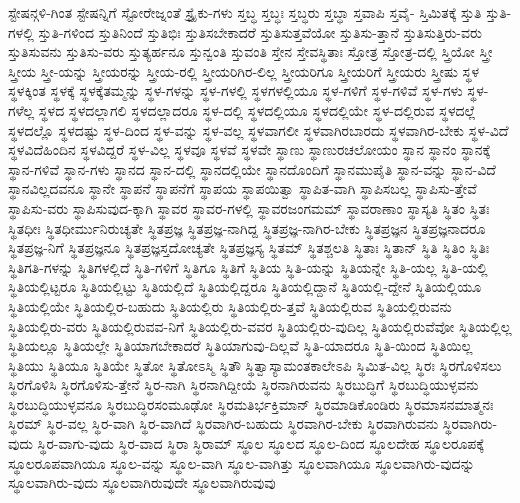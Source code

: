 {ಸ್ಟೇಷನ್ಗಳಿ-ಗಿಂತ
ಸ್ಟೇಷನ್ನಿಗೆ
ಸ್ಟೋರೇಜ್ನಂತೆ
ಸ್ಟ್ರೈಕು-ಗಳು
ಸ್ತಬ್ಧ
ಸ್ತಬ್ಧಃ
ಸ್ತಬ್ಧರು
ಸ್ತಬ್ಧಾ
ಸ್ತವಾಪಿ
ಸ್ತವೈ-
ಸ್ತಿಮಿತಕ್ಕೆ
ಸ್ತುತಿ
ಸ್ತುತಿ-ಗಳಲ್ಲಿ
ಸ್ತುತಿ-ಗಳಿಂದ
ಸ್ತುತಿನಿಂದೆ
ಸ್ತುತಿಭಿಃ
ಸ್ತುತಿಸಬೇಕಾದರೆ
ಸ್ತುತಿಸುತ್ತವೆಯೋ
ಸ್ತುತಿಸು-ತ್ತಾನೆ
ಸ್ತುತಿಸುತ್ತಿರು-ವರು
ಸ್ತುತಿಸುವನು
ಸ್ತುತಿಸು-ವರು
ಸ್ತುತ್ಯರ್ಹನೂ
ಸ್ತುನ್ವಂತಿ
ಸ್ತುವಂತಿ
ಸ್ತೇನ
ಸ್ತೇವಸ್ಥಿತಾಃ
ಸ್ತೋತ್ರ
ಸ್ತೋತ್ರ-ದಲ್ಲಿ
ಸ್ತ್ರಿಯೋ
ಸ್ತ್ರೀ
ಸ್ತ್ರೀಯ
ಸ್ತ್ರೀ-ಯನ್ನು
ಸ್ತ್ರೀಯರನ್ನು
ಸ್ತ್ರೀಯ-ರಲ್ಲಿ
ಸ್ತ್ರೀಯರಿಗಿರ-ಲಿಲ್ಲ
ಸ್ತ್ರೀಯರಿಗೂ
ಸ್ತ್ರೀಯರಿಗೆ
ಸ್ತ್ರೀಯರು
ಸ್ತ್ರೀಷು
ಸ್ಥಳ
ಸ್ಥಳಕ್ಕಿಂತ
ಸ್ಥಳಕ್ಕೆ
ಸ್ಥಳಕ್ಕೆತಮ್ಮನ್ನು
ಸ್ಥಳ-ಗಳನ್ನು
ಸ್ಥಳ-ಗಳಲ್ಲಿ
ಸ್ಥಳಗಳಲ್ಲಿಯೂ
ಸ್ಥಳ-ಗಳಿಗೆ
ಸ್ಥಳ-ಗಳಿವೆ
ಸ್ಥಳ-ಗಳು
ಸ್ಥಳ-ಗಳೆಲ್ಲ
ಸ್ಥಳದ
ಸ್ಥಳದಲ್ಲಾಗಲಿ
ಸ್ಥಳದಲ್ಲಾದರೂ
ಸ್ಥಳ-ದಲ್ಲಿ
ಸ್ಥಳದಲ್ಲಿಯೂ
ಸ್ಥಳದಲ್ಲಿಯೇ
ಸ್ಥಳ-ದಲ್ಲಿರುವ
ಸ್ಥಳದಲ್ಲೆ
ಸ್ಥಳದಲ್ಲೊ
ಸ್ಥಳದಷ್ಟು
ಸ್ಥಳ-ದಿಂದ
ಸ್ಥಳ-ವನ್ನು
ಸ್ಥಳ-ವಲ್ಲ
ಸ್ಥಳವಾಗಲೀ
ಸ್ಥಳವಾಗಿರಬಾರದು
ಸ್ಥಳವಾಗಿರ-ಬೇಕು
ಸ್ಥಳ-ವಿದೆ
ಸ್ಥಳವಿದೆಹಿಂದಿನ
ಸ್ಥಳವಿದ್ದರೆ
ಸ್ಥಳ-ವಿಲ್ಲ
ಸ್ಥಳವೂ
ಸ್ಥಳವೆ
ಸ್ಥಳವೇ
ಸ್ಥಾಣು
ಸ್ಥಾಣುರಚಲೋಯಂ
ಸ್ಥಾನ
ಸ್ಥಾನಂ
ಸ್ಥಾನಕ್ಕೆ
ಸ್ಥಾನ-ಗಳಿವೆ
ಸ್ಥಾನ-ಗಳು
ಸ್ಥಾನದ
ಸ್ಥಾನ-ದಲ್ಲಿ
ಸ್ಥಾನದಲ್ಲಿಯೇ
ಸ್ಥಾನದೊಂದಿಗೆ
ಸ್ಥಾನಮುಪೈತಿ
ಸ್ಥಾನ-ವನ್ನು
ಸ್ಥಾನ-ವಿದೆ
ಸ್ಥಾನವಿಲ್ಲದವನೂ
ಸ್ಥಾನೇ
ಸ್ಥಾಪನೆ
ಸ್ಥಾಪನೆಗೆ
ಸ್ಥಾಪಯ
ಸ್ಥಾಪಯಿತ್ವಾ
ಸ್ಥಾಪಿತ-ವಾಗಿ
ಸ್ಥಾಪಿಸಬಲ್ಲ
ಸ್ಥಾಪಿಸು-ತ್ತೇವೆ
ಸ್ಥಾಪಿಸು-ವರು
ಸ್ಥಾಪಿಸುವುದ-ಕ್ಕಾಗಿ
ಸ್ಥಾವರ
ಸ್ಥಾವರ-ಗಳಲ್ಲಿ
ಸ್ಥಾವರಜಂಗಮಮ್
ಸ್ಥಾವರಾಣಾಂ
ಸ್ಥಾಸ್ಯತಿ
ಸ್ಥಿತಂ
ಸ್ಥಿತಃ
ಸ್ಥಿತಧೀಃ
ಸ್ಥಿತಧೀರ್ಮುನಿರುಚ್ಯತೇ
ಸ್ಥಿತಪ್ರಜ್ಞ
ಸ್ಥಿತಪ್ರಜ್ಞ-ನಾಗಿದ್ದ
ಸ್ಥಿತಪ್ರಜ್ಞ-ನಾಗಿರ-ಬೇಕು
ಸ್ಥಿತಪ್ರಜ್ಞನ
ಸ್ಥಿತಪ್ರಜ್ಞನಾದರೂ
ಸ್ಥಿತಪ್ರಜ್ಞ-ನಿಗೆ
ಸ್ಥಿತಪ್ರಜ್ಞನೂ
ಸ್ಥಿತಪ್ರಜ್ಞಸ್ತದೋಚ್ಯತೇ
ಸ್ಥಿತಪ್ರಜ್ಞಸ್ಯ
ಸ್ಥಿತಮ್
ಸ್ಥಿತಶ್ಚಲತಿ
ಸ್ಥಿತಾಃ
ಸ್ಥಿತಾನ್
ಸ್ಥಿತಿ
ಸ್ಥಿತಿಂ
ಸ್ಥಿತಿಃ
ಸ್ಥಿತಿಗತಿ-ಗಳನ್ನು
ಸ್ಥಿತಿಗಳಲ್ಲಿದೆ
ಸ್ಥಿತಿ-ಗಳಿಗೆ
ಸ್ಥಿತಿಗೂ
ಸ್ಥಿತಿಗೆ
ಸ್ಥಿತಿಯ
ಸ್ಥಿತಿ-ಯನ್ನು
ಸ್ಥಿತಿಯನ್ನೇ
ಸ್ಥಿತಿ-ಯಲ್ಲ
ಸ್ಥಿತಿ-ಯಲ್ಲಿ
ಸ್ಥಿತಿಯಲ್ಲಿಟ್ಟರೂ
ಸ್ಥಿತಿಯಲ್ಲಿಟ್ಟು
ಸ್ಥಿತಿಯಲ್ಲಿದೆ
ಸ್ಥಿತಿಯಲ್ಲಿದ್ದರೂ
ಸ್ಥಿತಿಯಲ್ಲಿದ್ದಾನೆ
ಸ್ಥಿತಿಯಲ್ಲಿ-ದ್ದೇನೆ
ಸ್ಥಿತಿಯಲ್ಲಿಯೂ
ಸ್ಥಿತಿಯಲ್ಲಿಯೇ
ಸ್ಥಿತಿಯಲ್ಲಿರ-ಬಹುದು
ಸ್ಥಿತಿಯಲ್ಲಿರು
ಸ್ಥಿತಿಯಲ್ಲಿರು-ತ್ತವೆ
ಸ್ಥಿತಿಯಲ್ಲಿರುವ
ಸ್ಥಿತಿಯಲ್ಲಿರುವನು
ಸ್ಥಿತಿಯಲ್ಲಿರು-ವರು
ಸ್ಥಿತಿಯಲ್ಲಿರುವವ-ನಿಗೆ
ಸ್ಥಿತಿಯಲ್ಲಿರು-ವವರ
ಸ್ಥಿತಿಯಲ್ಲಿರು-ವುದಿಲ್ಲ
ಸ್ಥಿತಿಯಲ್ಲಿರುವೆವೋ
ಸ್ಥಿತಿಯಲ್ಲಿಲ್ಲ
ಸ್ಥಿತಿಯಲ್ಲೂ
ಸ್ಥಿತಿಯಲ್ಲೇ
ಸ್ಥಿತಿಯಾಗಬೇಕಾದರೆ
ಸ್ಥಿತಿಯಾಗುವು-ದಿಲ್ಲವೆ
ಸ್ಥಿತಿ-ಯಾದರೂ
ಸ್ಥಿತಿ-ಯಿಂದ
ಸ್ಥಿತಿಯಿಲ್ಲ
ಸ್ಥಿತಿಯು
ಸ್ಥಿತಿಯೂ
ಸ್ಥಿತಿಯೇ
ಸ್ಥಿತೋ
ಸ್ಥಿತೋಽಸ್ಮಿ
ಸ್ಥಿತೌ
ಸ್ಥಿತ್ವಾಸ್ಯಾಮಂತಕಾಲೇಽಪಿ
ಸ್ಥಿಮಿತ-ವಿಲ್ಲ
ಸ್ಥಿರಃ
ಸ್ಥಿರಗೊಳಿಸಲು
ಸ್ಥಿರಗೊಳಿಸಿ
ಸ್ಥಿರಗೊಳಿಸು-ತ್ತೇನೆ
ಸ್ಥಿರ-ನಾಗಿ
ಸ್ಥಿರನಾಗಿದ್ದೀಯೆ
ಸ್ಥಿರನಾಗಿರುವನು
ಸ್ಥಿರಬುದ್ಧಿಗೆ
ಸ್ಥಿರಬುದ್ಧಿಯುಳ್ಳವನು
ಸ್ಥಿರಬುದ್ಧಿಯುಳ್ಳವನೂ
ಸ್ಥಿರಬುದ್ಧಿರಸಂಮೂಢೋ
ಸ್ಥಿರಮತಿರ್ಭಕ್ತಿಮಾನ್
ಸ್ಥಿರಮಾಡಿಕೊಂಡಿರು
ಸ್ಥಿರಮಾಸನಮಾತ್ಮನಃ
ಸ್ಥಿರಮ್
ಸ್ಥಿರ-ವಲ್ಲ
ಸ್ಥಿರ-ವಾಗಿ
ಸ್ಥಿರ-ವಾಗಿದೆ
ಸ್ಥಿರವಾಗಿರ-ಬಹುದು
ಸ್ಥಿರವಾಗಿರ-ಬೇಕು
ಸ್ಥಿರವಾಗಿರುವನು
ಸ್ಥಿರವಾಗಿರು-ವುದು
ಸ್ಥಿರ-ವಾಗು-ವುದು
ಸ್ಥಿರ-ವಾದ
ಸ್ಥಿರಾ
ಸ್ಥಿರಾಮ್
ಸ್ಥೂಲ
ಸ್ಥೂಲದ
ಸ್ಥೂಲ-ದಿಂದ
ಸ್ಥೂಲದೇಹ
ಸ್ಥೂಲರೂಪಕ್ಕೆ
ಸ್ಥೂಲರೂಪವಾಗಿಯೂ
ಸ್ಥೂಲ-ವನ್ನು
ಸ್ಥೂಲ-ವಾಗಿ
ಸ್ಥೂಲ-ವಾಗಿತ್ತು
ಸ್ಥೂಲವಾಗಿಯೂ
ಸ್ಥೂಲವಾಗಿರು-ವುದನ್ನು
ಸ್ಥೂಲವಾಗಿರು-ವುದು
ಸ್ಥೂಲವಾಗಿರುವುದೇ
ಸ್ಥೂಲವಾಗಿರುವುವು
}
